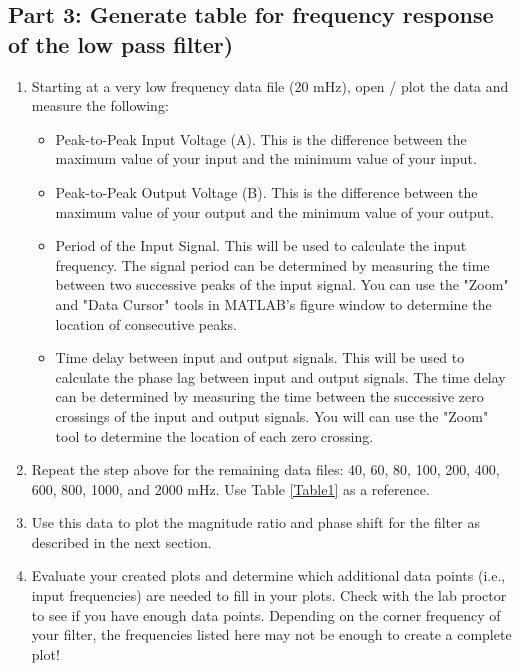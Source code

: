 \documentclass{article} %
\begin{document}
\subsection{Part 3: Generate table for frequency response of the low pass filter)}
\begin{enumerate}
    \item Starting at a very low frequency data file (20 mHz), open / plot the data and measure the following:
    \begin{itemize}
        \item Peak-to-Peak Input Voltage (A). This is the difference between the maximum value of your input and the minimum value of your input.
        \item Peak-to-Peak Output Voltage (B). This is the difference between the maximum value of your output and the minimum value of your output.
        \item Period of the Input Signal. This will be used to calculate the input frequency. The signal period can be determined by measuring the time between two successive peaks of the input signal. You can use the "Zoom" and "Data Cursor" tools in MATLAB's figure window to determine the location of consecutive peaks.
        \item Time delay between input and output signals. This will be used to calculate the phase lag between input and output signals. The time delay can be determined by measuring the time between the successive zero crossings of the input and output signals. You will can use the "Zoom" tool to determine the location of each zero crossing.
    \end{itemize}
    \item Repeat the step above for the remaining data files: 40, 60, 80, 100, 200, 400, 600, 800, 1000, and 2000 mHz. Use Table \ref{Table1} as a reference.
    \item Use this data to plot the magnitude ratio and phase shift for the filter as described in the next section. 
    \item Evaluate your created plots and determine which additional data points (i.e., input frequencies) are needed to fill in your plots. Check with the lab proctor to see if you have enough data points. Depending on the corner frequency of your filter, the frequencies listed here may not be enough to create a complete plot!
\end{enumerate}
\end{document}

